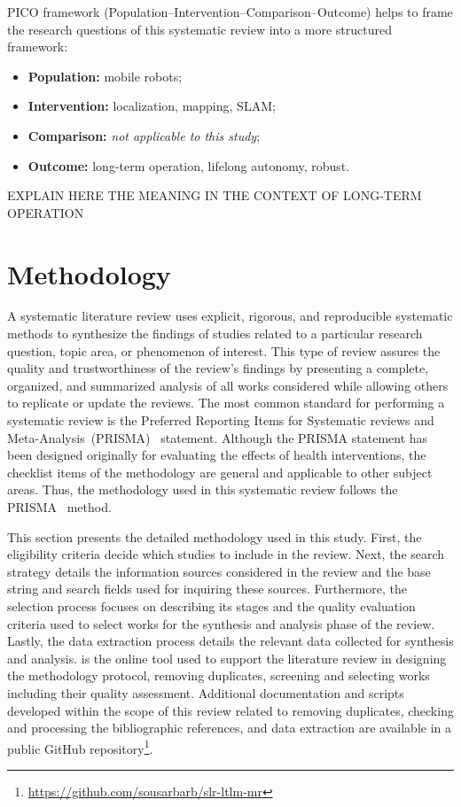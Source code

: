 \documentclass[10pt,a4paper,notitlepage,twocolumn,oneside]{article}
\begin{document}
PICO framework (Population--Intervention--Comparison--Outcome) helps to frame the research questions of this systematic review into a more structured framework:

\begin{itemize}\setlength\itemsep{-0.5em}
\item \textbf{Population:} mobile robots;
\item \textbf{Intervention:} localization, mapping, SLAM;
\item \textbf{Comparison:} \textit{not applicable to this study};
\item \textbf{Outcome:} long-term operation, lifelong autonomy, robust.
\end{itemize}

EXPLAIN HERE THE MEANING IN THE CONTEXT OF LONG-TERM OPERATION

\section{Methodology}
\label{sec:methodology}

A systematic literature review uses explicit, rigorous, and reproducible systematic methods to synthesize the findings of studies related to a particular research question, topic area, or phenomenon of interest. This type of review assures the quality and trustworthiness of the review's findings by presenting a complete, organized, and summarized analysis of all works considered while allowing others to replicate or update the reviews. The most common standard for performing a systematic review is the Preferred Reporting Items for Systematic reviews and Meta-Analysis~(PRISMA)~\parencite{methodology:prisma} statement. Although the PRISMA statement has been designed originally for evaluating the effects of health interventions, the checklist items of the methodology are general and applicable to other subject areas. Thus, the methodology used in this systematic review follows the PRISMA~\parencite{methodology:prisma} method.

This section presents the detailed methodology used in this study. First, the eligibility criteria decide which studies to include in the review. Next, the search strategy details the information sources considered in the review and the base string and search fields used for inquiring these sources. Furthermore, the selection process focuses on describing its stages and the quality evaluation criteria used to select works for the synthesis and analysis phase of the review. Lastly, the data extraction process details the relevant data collected for synthesis and analysis.
 is the online tool used to support the literature review in designing the methodology protocol, removing duplicates, screening and selecting works including their quality assessment. Additional documentation and scripts developed within the scope of this review related to removing duplicates, checking and processing the bibliographic references, and data extraction are available in a public GitHub repository\footnote{\url{https://github.com/sousarbarb/slr-ltlm-mr}}.
\end{document}
